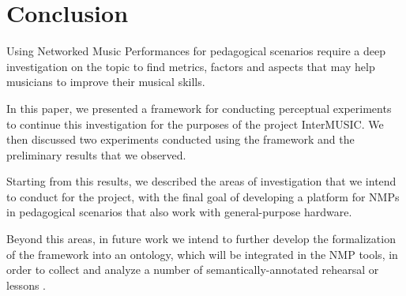 
\section{Conclusion}\label{sec:conclusion}

Using Networked Music Performances for pedagogical scenarios require a deep investigation on the topic to find metrics, factors and aspects that may help musicians to improve their musical skills.

In this paper, we presented a framework for conducting perceptual experiments to continue this investigation for the purposes of the project InterMUSIC. We then discussed two experiments conducted using the framework and the preliminary results that we observed.

Starting from this results, we described the areas of investigation that we intend to conduct for the project, with the final goal of developing a platform for NMPs in pedagogical scenarios that also work with general-purpose hardware.

Beyond this areas, in future work we intend to further develop the formalization of the framework into an ontology, which will be integrated in the NMP tools, in order to collect and analyze a number of semantically-annotated rehearsal or lessons \cite{Kolazi2013}. 

 
